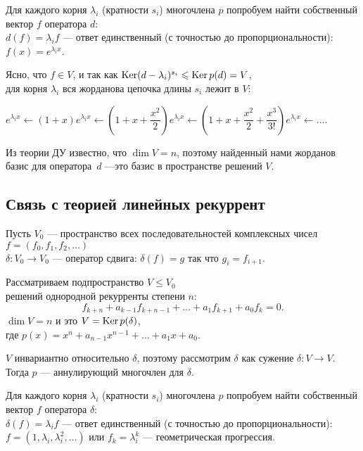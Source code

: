 \otstup

Для каждого корня $\lambda_i$ (кратности $s_i$) многочлена $p$ попробуем найти собственный вектор $f$ оператора $d$:\\
$d(f) = \lambda_i f$ --- ответ единственный (с точностью до пропорциональности): $f(x) = e^{\lambda_i x} $.

\otstup

Ясно, что $f\in V$, и так как 
$\mathop{\rm Ker}\nolimits (d-\lambda_i)^{s_i} \leqslant  \mathop{\rm Ker}\nolimits p(d)=V$, \\
для корня $\lambda_i$ вся жорданова цепочка длины $s_i$ лежит в $V$:

$e^{\lambda_i x} \leftarrow (1+x) e^{\lambda_i x} \leftarrow (1+x+\dfrac{x^2}{2}) e^{\lambda_i x}
\leftarrow (1+x+\dfrac{x^2}{2}+\dfrac{x^3}{3!}) e^{\lambda_i x} \leftarrow \ldots$.

\otstup

Из теории ДУ известно, что $\dim V = n$, 
поэтому найденный нами жорданов базис для оператора~$d$ ---это базис в пространстве решений $V$.


\subsection{Связь с теорией линейных рекуррент}


Пусть $V_0$ --- пространство всех последовательностей комплексных чисел $f=(f_0, f_1, f_2, \ldots)$ \\
 $\delta: V_0 \to V_0$ --- оператор сдвига: $\delta (f) = g$ так что $g_i=f_{i+1}$. 

\otstup

Рассматриваем подпространство $V\leq V_0$ \\решений однородной рекурренты степени $n$:
$$f_{k+n}+a_{k-1}f_{k+n-1}+\ldots +a_1f_{k+1}+a_0f_k=0.$$
$\dim V = n$ и это $V = \mathop{\rm Ker}\nolimits p(\delta)$, \\где $p(x) = x^{n}+a_{n-1}x^{n-1}+\ldots +a_1x+a_0$.

\otstup

$V$ инвариантно относительно $\delta$, поэтому рассмотрим $\delta$ как сужение $\delta: V\to V$.\\
Тогда $p$ --- аннулирующий многочлен для $\delta$. \\

\otstup

Для каждого корня $\lambda_i$ (кратности $s_i$) многочлена $p$ попробуем найти собственный вектор 
$f$ оператора $\delta$:\\
$\delta(f) = \lambda_i f$ --- ответ единственный (с точностью до пропорциональности): \\
$f = (1, \lambda_i, \lambda_i^2, \ldots) $ или $f_k = \lambda_i^k$ --- геометрическая прогрессия.

